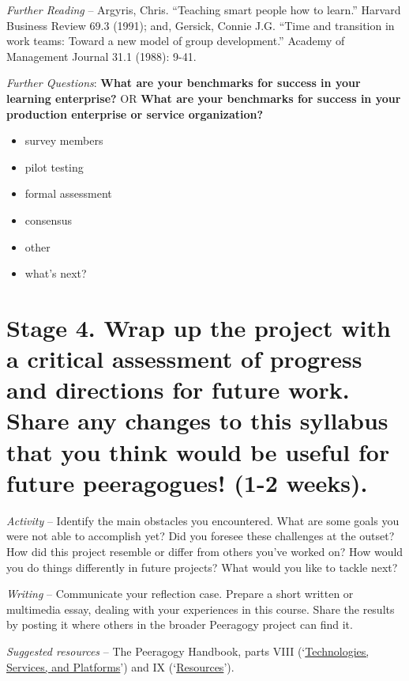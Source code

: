 \emph{Further Reading} -- Argyris, Chris. ``Teaching smart people how to
learn.'' Harvard Business Review 69.3 (1991); and, Gersick, Connie J.G.
``Time and transition in work teams: Toward a new model of group
development.'' Academy of Management Journal 31.1 (1988): 9-41.

\emph{Further Questions}: \textbf{What are your benchmarks for success
in your learning enterprise?} OR \textbf{What are your benchmarks for
success in your production enterprise or service organization?}

\begin{itemize}
\itemsep1pt\parskip0pt
\item
  survey members
\item
  pilot testing
\item
  formal assessment
\item
  consensus
\item
  other
\item
  what's next?
\end{itemize}

\section*{Stage 4. Wrap up the project with a critical assessment of
progress and directions for future work. Share any changes to this
syllabus that you think would be useful for future peeragogues! (1-2
weeks).}\label{stage-4.-wrap-up-the-project-with-a-critical-assessment-of-progress-and-directions-for-future-work.-share-any-changes-to-this-syllabus-that-you-think-would-be-useful-for-future-peeragogues-1-2-weeks.}

\emph{Activity} -- Identify the main obstacles you encountered. What are
some goals you were not able to accomplish yet? Did you foresee these
challenges at the outset? How did this project resemble or differ from
others you've worked on? How would you do things differently in future
projects? What would you like to tackle next?

\emph{Writing} -- Communicate your reflection case. Prepare a short
written or multimedia essay, dealing with your experiences in this
course. Share the results by posting it where others in the broader
Peeragogy project can find it.

\emph{Suggested resources} -- The Peeragogy Handbook, parts VIII
(`\href{http://peeragogy.org/resources/technologies/}{Technologies,
Services, and Platforms}') and IX
(`\href{http://peeragogy.org/resources/}{Resources}').

